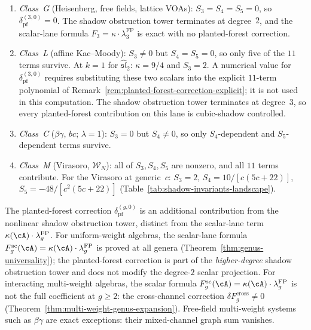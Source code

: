 \begin{computation}\label{comp:genus3-pf-by-class}
\begin{enumerate}[label=\textup{(\roman*)}]
\item \emph{Class~G} (Heisenberg, free fields, lattice VOAs):
$S_3 = S_4 = S_5 = 0$, so
$\delta_{\mathrm{pf}}^{(3,0)} = 0$. The shadow obstruction tower terminates
at degree~$2$, and the scalar-lane formula
$F_3 = \kappa \cdot \lambda_3^{\mathrm{FP}}$ is exact with no
planted-forest correction.

\item \emph{Class~L} (affine Kac--Moody):
$S_3 \neq 0$ but $S_4 = S_5 = 0$, so only five of the
$11$ terms survive. At $k = 1$ for $\widehat{\mathfrak{sl}}_2$:
$\kappa = 9/4$ and $S_3 = 2$. A numerical value for
$\delta_{\mathrm{pf}}^{(3,0)}$ requires substituting these two
scalars into the explicit $11$-term polynomial of
Remark~\ref{rem:planted-forest-correction-explicit}; it is not
used in this computation. The shadow obstruction tower terminates
at degree~$3$, so every planted-forest contribution on this lane is
cubic-shadow controlled.

\item \emph{Class~C} ($\beta\gamma$, $bc$; $\lambda = 1$):
$S_3 = 0$ but $S_4 \neq 0$, so only $S_4$-dependent
and $S_5$-dependent terms survive.

\item \emph{Class~M} (Virasoro, $\mathcal{W}_N$):
all of $S_3, S_4, S_5$ are nonzero, and all $11$ terms
contribute. For the Virasoro at generic~$c$:
$S_3 = 2$,
$S_4 = 10/[c(5c{+}22)]$,
$S_5 = -48/[c^2(5c{+}22)]$
(Table~\ref{tab:shadow-invariants-landscape}).
\end{enumerate}
\end{computation}

\begin{remark}\label{rem:pf-does-not-affect-scalar-lane}

The planted-forest correction $\delta_{\mathrm{pf}}^{(g,0)}$ is an
additional contribution from the nonlinear shadow obstruction tower, distinct
from the scalar-lane term $\kappa(\cA) \cdot \lambda_g^{\mathrm{FP}}$.
For uniform-weight algebras, the scalar-lane formula
$F_g^{\mathrm{sc}}(\cA)
=\kappa(\cA) \cdot \lambda_g^{\mathrm{FP}}$ is proved at all
genera (Theorem~\ref{thm:genus-universality}); the planted-forest
correction is part of the \emph{higher-degree} shadow obstruction tower and
does not modify the degree-$2$ scalar projection. For interacting
multi-weight algebras, the scalar formula
$F_g^{\mathrm{sc}}(\cA)
=\kappa(\cA) \cdot \lambda_g^{\mathrm{FP}}$ is not the full coefficient at $g \geq 2$:
the cross-channel correction
$\delta F_g^{\mathrm{cross}} \neq 0$
(Theorem~\ref{thm:multi-weight-genus-expansion}). Free-field
multi-weight systems such as $\beta\gamma$ are exact exceptions:
their mixed-channel graph sum vanishes.
\end{remark}

